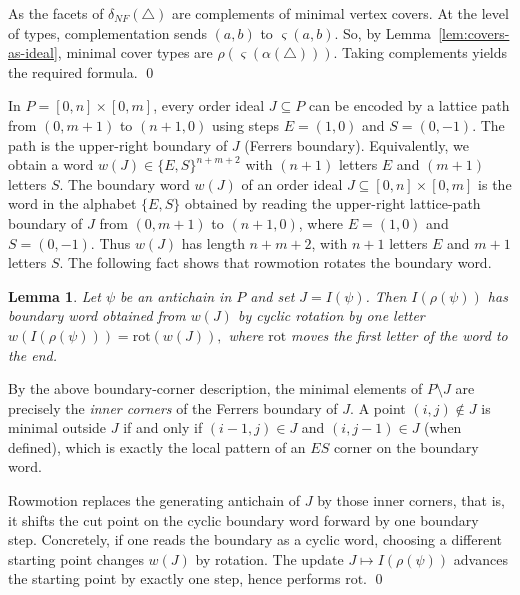 \documentclass[12pt]{article}
\renewenvironment{proof}{{\noindent\bfseries Proof.}}{\qed}
\theoremstyle{plain}
\newtheorem{lemma}[theorem]{Lemma}
\theoremstyle{definition}
\begin{document}
	\begin{proof}
		As the facets of $\delta_{NF}(\bigtriangleup)$ are complements of minimal vertex covers.
		At the level of types, complementation sends $(a,b)$ to $\varsigma(a,b)$. So, by Lemma~\ref{lem:covers-as-ideal},
		minimal cover types are $\rho(\varsigma(\alpha(\bigtriangleup)))$. Taking complements yields the required formula.
	\end{proof}
	
	\medskip
	
	In $P=[0,n]\times[0,m]$, every order ideal $J\subseteq P$ can be encoded by a lattice path from
	$(0,m+1)$ to $(n+1,0)$ using steps $E=(1,0)$ and $S=(0,-1)$. The path is the upper-right boundary
	of $J$ (Ferrers boundary). Equivalently, we obtain a word $w(J)\in\{E,S\}^{n+m+2}$ 	with $(n+1)$ letters $E$ and $(m+1)$ letters $S$.  The boundary word $w(J)$ of an order ideal $J\subseteq [0,n]\times[0,m]$ is the word in the alphabet $\{E,S\}$ obtained by reading the upper-right lattice-path boundary of $J$ from $(0,m+1)$ to $(n+1,0)$, where $E=(1,0)$ and $S=(0,-1)$. Thus $w(J)$ has length $n+m+2$, with $n+1$ letters $E$ and $m+1$ letters $S$.
	The following fact shows that rowmotion rotates the boundary word.
	\begin{lemma}\label{lem:rowmotion-rotation}
		Let $\psi$ be an antichain in $P$ and set $J=I(\psi)$.
		Then $I(\rho(\psi))$ has boundary word obtained from $w(J)$ by cyclic rotation by one letter $w(I(\rho(\psi)))=\mathrm{rot}(w(J)),$ 		where $\mathrm{rot}$ moves the first letter of the word to the end.
	\end{lemma}
	
	\begin{proof}
		By the above boundary-corner description, the minimal elements of $P\setminus J$ are precisely the \emph{inner corners} of the Ferrers boundary of $J$. A point $(i,j)\notin J$ is minimal outside $J$ if and only if $(i-1,j)\in J$ and $(i,j-1)\in J$ (when defined),
		which is exactly the local pattern of an $ES$ corner on the boundary word.
		
		Rowmotion replaces the generating antichain of $J$ by those inner corners, that is, it shifts the cut point		on the cyclic boundary word forward by one boundary step. Concretely, if one reads the boundary as a cyclic word,
		choosing a different starting point changes $w(J)$ by rotation. The update $J\mapsto I(\rho(\psi))$ advances
		the starting point by exactly one step, hence performs $\mathrm{rot}$. %
	\end{proof}
	
\end{document}
